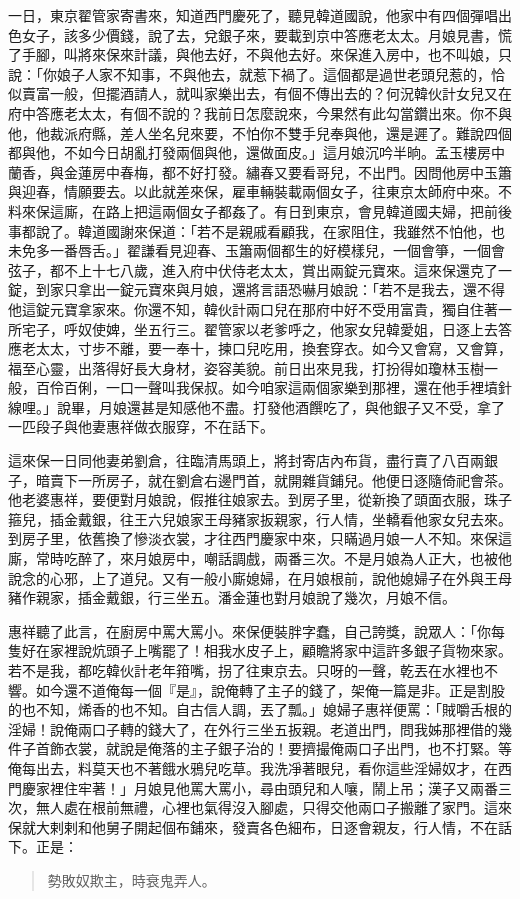 一日，東京翟管家寄書來，知道西門慶死了，聽見韓道國說，他家中有四個彈唱出色女子，該多少價錢，說了去，兌銀子來，要載到京中答應老太太。月娘見書，慌了手腳，叫將來保來計議，與他去好，不與他去好。來保進入房中，也不叫娘，只說：「你娘子人家不知事，不與他去，就惹下禍了。這個都是過世老頭兒惹的，恰似賣富一般，但擺酒請人，就叫家樂出去，有個不傳出去的？何況韓伙計女兒又在府中答應老太太，有個不說的？我前日怎麼說來，今果然有此勾當鑽出來。你不與他，他裁派府縣，差人坐名兒來要，不怕你不雙手兒奉與他，還是遲了。難說四個都與他，不如今日胡亂打發兩個與他，還做面皮。」這月娘沉吟半晌。孟玉樓房中蘭香，與金蓮房中春梅，都不好打發。繡春又要看哥兒，不出門。因問他房中玉簫與迎春，情願要去。以此就差來保，雇車輛裝載兩個女子，往東京太師府中來。不料來保這廝，在路上把這兩個女子都姦了。有日到東京，會見韓道國夫婦，把前後事都說了。韓道國謝來保道：「若不是親戚看顧我，在家阻住，我雖然不怕他，也未免多一番唇舌。」翟謙看見迎春、玉簫兩個都生的好模樣兒，一個會箏，一個會弦子，都不上十七八歲，進入府中伏侍老太太，賞出兩錠元寶來。這來保還克了一錠，到家只拿出一錠元寶來與月娘，還將言語恐嚇月娘說：「若不是我去，還不得他這錠元寶拿家來。你還不知，韓伙計兩口兒在那府中好不受用富貴，獨自住著一所宅子，呼奴使婢，坐五行三。翟管家以老爹呼之，他家女兒韓愛姐，日逐上去答應老太太，寸步不離，要一奉十，揀口兒吃用，換套穿衣。如今又會寫，又會算，福至心靈，出落得好長大身材，姿容美貌。前日出來見我，打扮得如瓊林玉樹一般，百伶百俐，一口一聲叫我保叔。如今咱家這兩個家樂到那裡，還在他手裡墳針線哩。」說畢，月娘還甚是知感他不盡。打發他酒饌吃了，與他銀子又不受，拿了一匹段子與他妻惠祥做衣服穿，不在話下。

這來保一日同他妻弟劉倉，往臨清馬頭上，將封寄店內布貨，盡行賣了八百兩銀子，暗賣下一所房子，就在劉倉右邊門首，就開雜貨鋪兒。他便日逐隨倚祀會茶。他老婆惠祥，要便對月娘說，假推往娘家去。到房子里，從新換了頭面衣服，珠子箍兒，插金戴銀，往王六兒娘家王母豬家扳親家，行人情，坐轎看他家女兒去來。到房子里，依舊換了慘淡衣裳，才往西門慶家中來，只瞞過月娘一人不知。來保這廝，常時吃醉了，來月娘房中，嘲話調戲，兩番三次。不是月娘為人正大，也被他說念的心邪，上了道兒。又有一般小廝媳婦，在月娘根前，說他媳婦子在外與王母豬作親家，插金戴銀，行三坐五。潘金蓮也對月娘說了幾次，月娘不信。

惠祥聽了此言，在廚房中罵大罵小。來保便裝胖字蠢，自己誇獎，說眾人：「你每隻好在家裡說炕頭子上嘴罷了！相我水皮子上，顧瞻將家中這許多銀子貨物來家。若不是我，都吃韓伙計老年箝嘴，拐了往東京去。只呀的一聲，乾丟在水裡也不響。如今還不道俺每一個『是』，說俺轉了主子的錢了，架俺一篇是非。正是割股的也不知，烯香的也不知。自古信人調，丟了瓢。」媳婦子惠祥便罵：「賊嚼舌根的淫婦！說俺兩口子轉的錢大了，在外行三坐五扳親。老道出門，問我姊那裡借的幾件子首飾衣裳，就說是俺落的主子銀子治的！要擠撮俺兩口子出門，也不打緊。等俺每出去，料莫天也不著餓水鴉兒吃草。我洗凈著眼兒，看你這些淫婦奴才，在西門慶家裡住牢著！」月娘見他罵大罵小，尋由頭兒和人嚷，鬧上吊；漢子又兩番三次，無人處在根前無禮，心裡也氣得沒入腳處，只得交他兩口子搬離了家門。這來保就大剌剌和他舅子開起個布鋪來，發賣各色細布，日逐會親友，行人情，不在話下。正是：
\begin{quote}
勢敗奴欺主，時衰鬼弄人。
\end{quote}
